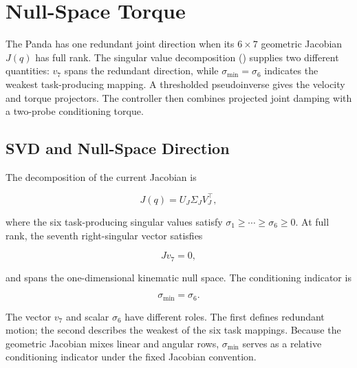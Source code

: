 
\section{Null-Space Torque}
\label{sec:nullspace_svd}

The Panda has one redundant joint direction when its
\mbox{\(6\times7\)} geometric Jacobian \mbox{\(J(q)\)} has full rank. The
singular value decomposition (\mbox{}) supplies two different
quantities: \mbox{\(v_7\)} spans the redundant direction, while
\mbox{\(\sigma_{\min}=\sigma_6\)} indicates the weakest task-producing
mapping. A thresholded pseudoinverse gives the velocity and torque projectors.
The controller then combines projected joint damping with a two-probe
conditioning torque.

\subsection{SVD and Null-Space Direction}
\label{subsec:svd_nullspace_characterisation}

The decomposition of the current Jacobian is

\begin{equation}
J(q)=U_J\Sigma_JV_J^\top,
\label{eq:jacobian_svd}
\end{equation}

where the six task-producing singular values satisfy
\mbox{\(\sigma_1\geq\cdots\geq\sigma_6\geq0\)}. At full rank, the
seventh right-singular vector satisfies

\begin{equation}
Jv_7=0,
\label{eq:nullspace_search_direction}
\end{equation}

and spans the one-dimensional kinematic null space. The conditioning indicator
is

\begin{equation}
\sigma_{\min}=\sigma_6.
\label{eq:min_singular_value}
\end{equation}

The vector \mbox{\(v_7\)} and scalar \mbox{\(\sigma_6\)} have
different roles. The first defines redundant motion; the second describes the
weakest of the six task mappings. Because the geometric Jacobian mixes linear
and angular rows, \mbox{\(\sigma_{\min}\)} serves as a relative conditioning
indicator under the fixed Jacobian convention.

